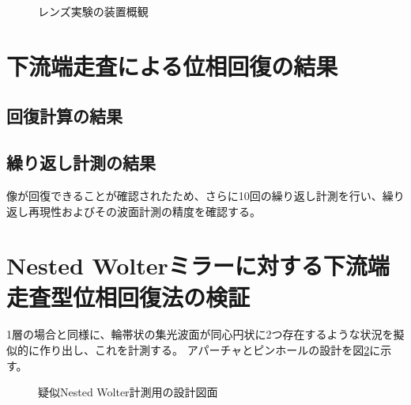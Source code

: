 \begin{figure}[!ht]
\centering


\caption[]{レンズ実験の装置概観}
\label{fig:lens_experiment_photograph}
\end{figure}



\clearpage
\newpage

\section{下流端走査による位相回復の結果}
\label{chap4_transverse_lens_result}

\subsection{回復計算の結果}
\label{chap4_transverse_lens_single_result}



\subsection{繰り返し計測の結果}

像が回復できることが確認されたため、さらに10回の繰り返し計測を行い、繰り返し再現性およびその波面計測の精度を確認する。


\clearpage
\newpage

\section{Nested Wolterミラーに対する下流端走査型位相回復法の検証}

1層の場合と同様に、輪帯状の集光波面が同心円状に2つ存在するような状況を擬似的に作り出し、これを計測する。
アパーチャとピンホールの設計を図\ref{fig:lens_nested_pinhole_ring_aperture}に示す。

\begin{figure}[!ht]
\centering

\caption[]{疑似Nested Wolter計測用の設計図面}
\label{fig:lens_nested_pinhole_ring_aperture}
\end{figure}

